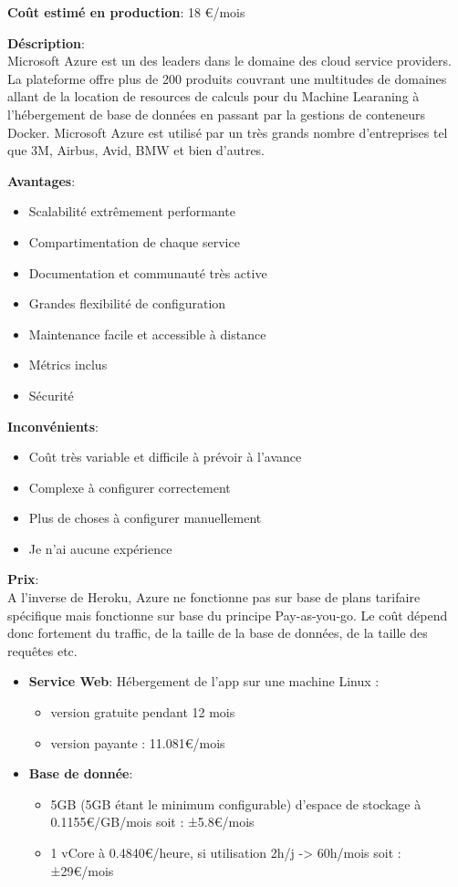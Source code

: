 \newpara
\textbf{Coût estimé en production}: 18 €/mois

\newpage
{}

\textbf{Déscription}: \\ Microsoft Azure est un des leaders dans le domaine des cloud service providers. La plateforme offre plus de 200 produits couvrant une multitudes de domaines allant de la location de resources de calculs pour du Machine Learaning à l'hébergement de base de données en passant par la gestions de conteneurs Docker.
\newpara
Microsoft Azure est utilisé par un très grands nombre d'entreprises tel que 3M, Airbus, Avid, BMW et bien d'autres.

\newpara
\textbf{Avantages}:
\begin{itemize}
  \item Scalabilité extrêmement performante
  \item Compartimentation de chaque service
  \item Documentation et communauté très active
  \item Grandes flexibilité de configuration
  \item Maintenance facile et accessible à distance
  \item Métrics inclus
  \item Sécurité
\end{itemize}

\newpara
\textbf{Inconvénients}:
\begin{itemize}
  \item Coût très variable et difficile à prévoir à l'avance
  \item Complexe à configurer correctement
  \item Plus de choses à configurer manuellement
  \item Je n'ai aucune expérience
\end{itemize}

\newpara
\textbf{Prix}: \\ A l'inverse de Heroku, Azure ne fonctionne pas sur base de plans tarifaire spécifique mais fonctionne sur base du principe Pay-as-you-go. Le coût dépend donc fortement du traffic, de la taille de la base de données, de la taille des requêtes etc.

\begin{itemize}
  \item \textbf{Service Web}: Hébergement de l'app sur une machine Linux :
  \begin{itemize}
    \item version gratuite pendant 12 mois
    \item version payante : 11.081€/mois
  \end{itemize}
  \item \textbf{Base de donnée}:
  \begin{itemize}
    \item 5GB (5GB étant le minimum configurable) d'espace de stockage à 0.1155€/GB/mois soit : ±5.8€/mois
    \item 1 vCore à 0.4840€/heure, si utilisation 2h/j -> 60h/mois soit : ±29€/mois
  \end{itemize}
\end{itemize}

